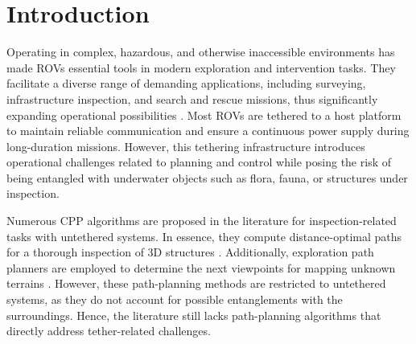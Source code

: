 \section{Introduction}
\label{sec:introduction}

%
%
%

Operating in complex, hazardous, and otherwise inaccessible environments has made \acp{ROV} essential tools in modern exploration and intervention tasks. They facilitate a diverse range of demanding applications, including surveying, infrastructure inspection, and search and rescue missions, thus significantly expanding operational possibilities \cite{amer2023unav, amer2025modelling}. Most \acp{ROV} are tethered to a host platform to maintain reliable communication and ensure a continuous power supply during long-duration missions. However, this tethering infrastructure introduces operational challenges related to planning and control while posing the risk of being entangled with underwater objects such as flora, fauna, or structures under inspection.

%
%


Numerous \ac{CPP} algorithms are proposed in the literature for inspection-related tasks with untethered systems. In essence, they compute distance-optimal paths for a thorough inspection of 3D structures \cite{bircher2015structural,feng2024fc, amer2023visual}.  Additionally, exploration path planners are employed to determine the next viewpoints for mapping unknown terrains \cite{dang2020graph}. However, these path-planning methods are restricted to untethered systems, as they do not account for possible entanglements with the surroundings. Hence, the literature still lacks path-planning algorithms that directly address tether-related challenges.


